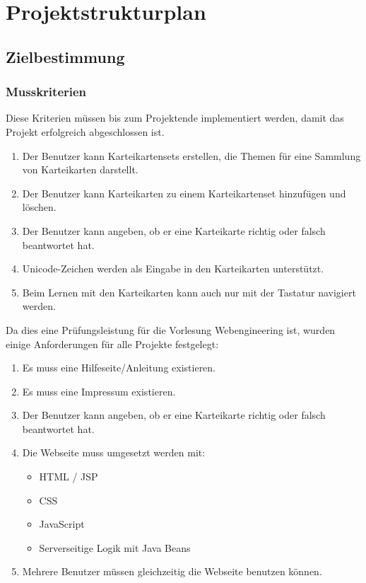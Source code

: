 \section{Projektstrukturplan}

\subsection{Zielbestimmung}
\subsubsection{Musskriterien}
Diese Kriterien müssen bis zum Projektende implementiert werden, damit das Projekt erfolgreich abgeschlossen ist.

\begin{enumerate}[leftmargin=2cm, label=\bfseries /MK\arabic*0/, series=mk]
	\item Der Benutzer kann Karteikartensets erstellen, die Themen für eine Sammlung von Karteikarten darstellt.
	\item Der Benutzer kann Karteikarten zu einem Karteikartenset hinzufügen und löschen.
	\item Der Benutzer kann angeben, ob er eine Karteikarte richtig oder falsch beantwortet hat.
	\item\label{unicode} Unicode-Zeichen werden als Eingabe in den Karteikarten unterstützt.
	\item\label{keyboard} Beim Lernen mit den Karteikarten kann auch nur mit der Tastatur navigiert werden.
\end{enumerate}

\noindent Da dies eine Prüfungsleistung für die Vorlesung Webengineering ist, wurden einige Anforderungen für alle Projekte festgelegt:
\begin{enumerate}[resume*=mk]
	\item Es muss eine Hilfeseite/Anleitung existieren.
	\item Es muss eine Impressum existieren.
	\item Der Benutzer kann angeben, ob er eine Karteikarte richtig oder falsch beantwortet hat.
	\item Die Webseite muss umgesetzt werden mit:
	\begin{itemize}
		\item HTML / JSP
		\item CSS
		\item JavaScript
		\item Serverseitige Logik mit Java Beans
	\end{itemize}
	\item Mehrere Benutzer müssen gleichzeitig die Webseite benutzen können.
\end{enumerate}


